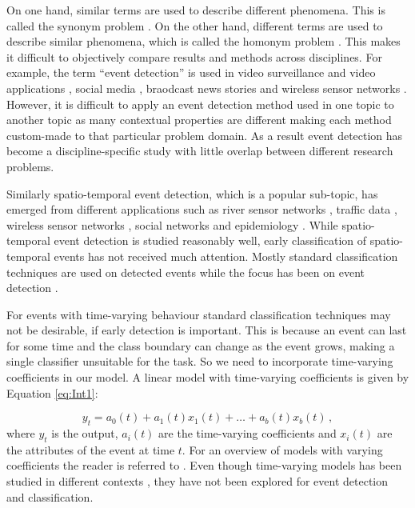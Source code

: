 \documentclass[11pt]{article}
\begin{document}
	On one hand, similar terms are used to describe different phenomena. This is called the synonym problem \cite{zhou2014spatiotemporal}. On the other hand, different terms are used to describe similar phenomena, which is called the homonym problem \cite{zhou2014spatiotemporal}. This makes it difficult to objectively compare results and methods across disciplines. For example, the term ``event detection'' is used in video surveillance and video applications \cite{adam2008robust, ke2005efficient, medioni2001event}, social media \cite{weng2011event, li2012tedas, abdelhaq2013eventweet}, braodcast news stories \cite{allan1998line, li2005probabilistic} and wireless sensor networks \cite{yin2009spatio, mao2015online}. However, it is difficult to apply an event detection method used in one topic to another topic as many contextual properties are different making each method custom-made to that particular problem domain. As a result event detection has become a discipline-specific study with little overlap between different research problems. 
	
	Similarly spatio-temporal event detection, which is a popular sub-topic, has emerged from different applications such as river sensor networks \cite{mao2015online}, traffic data \cite{souto2016event}, wireless sensor networks \cite{mousavi2013spatio}, social networks \cite{cheng2014event} and epidemiology \cite{gomide2011dengue}. While spatio-temporal event detection is  studied reasonably well, early classification of spatio-temporal events has not received much attention. Mostly standard classification techniques are used on detected events while the focus has been on event detection \cite{kang2014detecting}. 
	
	For events with time-varying behaviour standard classification techniques may not be desirable, if early detection is important. This is because an event can last for some time and the class boundary can change as the event grows, making a single classifier unsuitable for the task. So we need to incorporate time-varying coefficients in our model. A linear model with time-varying coefficients is given by Equation \eqref{eq:Int1}:
	
	\begin{equation}\label{eq:Int1}
	y_t = a_0(t)  + a_1(t) x_1(t) + \ldots + a_b(t)x_b(t) \, , 
	\end{equation} 
	\noindent
	where $y_t$ is the output, $a_i(t)$ are the time-varying coefficients and $x_i(t)$ are the attributes of the event at time $t$. For an overview of models with varying coefficients the reader is referred to \cite{hastie1993varying}. Even though time-varying models has been studied in different contexts \cite{harvey1989time, wang1998cluster, hoover1998nonparametric}, they have not been explored for event detection and classification. 
	
\end{document}

